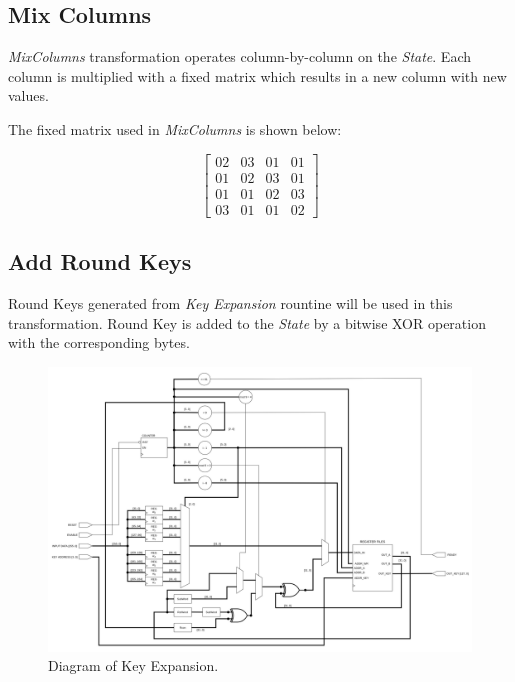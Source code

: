 \documentclass[a4paper, 10pt]{article}
\begin{document}
\begin{multicols}{2}
            \subsection{Mix Columns}
            \label{sec:mixcolumns}

            \textit{MixColumns} transformation operates column-by-column on the \textit{State}. Each column is multiplied with a fixed matrix which results in a new column with new values.

            The fixed matrix used in \textit{MixColumns} is shown below:

            \begin{equation}
            \begin{bmatrix}
                02 & 03 & 01 & 01\\
                01 & 02 & 03 & 01\\
                01 & 01 & 02 & 03\\
                03 & 01 & 01 & 02
            \end{bmatrix}
            \label{equ:mixcolumns-matrix}
        \end{equation}

            \subsection{Add Round Keys}

            Round Keys generated from \textit{Key Expansion} rountine will be used in this transformation. Round Key is added to the \textit{State} by a bitwise XOR operation with the corresponding bytes.
        \end{multicols}
    
        \noindent
        \begin{figure}[t]
            \centering
            \includegraphics[width=\textwidth]{KeyExpansion.png}
            \caption{Diagram of Key Expansion.}
            \label{fig:KeyExpansion}
        \end{figure}
\end{document}
